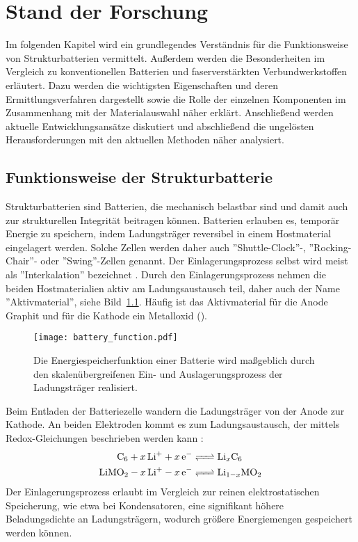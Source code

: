 \chapter{Stand der Forschung}

Im folgenden Kapitel wird ein grundlegendes Verständnis für die Funktionsweise von Strukturbatterien vermittelt. Außerdem werden die Besonderheiten im Vergleich zu konventionellen Batterien und faserverstärkten Verbundwerkstoffen erläutert. Dazu werden die wichtigsten Eigenschaften und deren Ermittlungsverfahren dargestellt sowie die Rolle der einzelnen Komponenten im Zusammenhang mit der Materialauswahl näher erklärt. Anschließend werden aktuelle Entwicklungsansätze diskutiert und abschließend die ungelösten Herausforderungen mit den aktuellen Methoden näher analysiert.

\section{Funktionsweise der Strukturbatterie} Strukturbatterien sind Batterien, die mechanisch belastbar sind und damit auch zur strukturellen Integrität beitragen können.
Batterien erlauben es, temporär Energie zu speichern, indem Ladungsträger reversibel in einem Hostmaterial eingelagert werden. Solche Zellen werden daher auch ''Shuttle-Clock''\cite{Ohzuku1993}-, ''Rocking-Chair''\cite{Tarascon1993}- oder ''Swing''\cite{Bittihn1993}-Zellen genannt. Der Einlagerungsprozess selbst wird meist als ''Interkalation'' bezeichnet \cite{Eichinger1976}. Durch den Einlagerungsprozess nehmen die beiden Hostmaterialien aktiv am Ladungsaustausch teil, daher auch der Name ''Aktivmaterial'', siehe Bild~\ref{fig:battery_function}. Häufig ist das Aktivmaterial für die Anode Graphit und für die Kathode ein Metalloxid ().
\begin{figure}[h]
        \center
	\texttt{[image: battery\_function.pdf]}
		\caption{\label{fig:battery_function}Die Energiespeicherfunktion einer Batterie wird maßgeblich durch den skalenübergreifenen Ein- und Auslagerungsprozess der Ladungsträger realisiert.}
\end{figure}
Beim Entladen der Batteriezelle wandern die Ladungsträger von der Anode zur Kathode. An beiden Elektroden kommt es zum Ladungsaustausch, der mittels Redox-Gleichungen beschrieben werden kann \cite{Goodenough2013}: 
\begin{align}
	\ce{C_6 + x Li^+ + x e^- &<=> Li_xC_6}\\ 
	\ce{LiMO_2 - x Li^+ - x e^- &<=> Li_{1-x}MO_2} 
\end{align} 
Der Einlagerungsprozess erlaubt im Vergleich zur reinen elektrostatischen Speicherung, wie etwa bei Kondensatoren, eine signifikant höhere Beladungsdichte an Ladungsträgern, wodurch größere Energiemengen gespeichert werden können.

